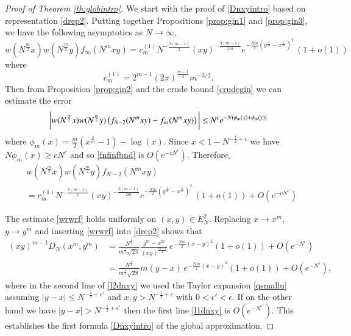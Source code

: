 \documentclass[11pt,reqno]{amsproc}
\numberwithin{equation}{section}
\numberwithin{theorem}{section}
\begin{document}
\begin{proof}[Proof of Theorem \ref{th:globintro}]	
We start with the proof of \eqref{Dnxyintro} based on representation \eqref{drep2}. Putting together Propositions \ref{prop:gin1} and \ref{prop:gin3}, we have the following asymptotics as $N \to \infty$,
\begin{equation}
w(N^{\frac{m}{2}}x)w(N^{\frac{m}{2}}y)f_{\infty}(N^{m}xy) = c_{m}^{(1)}N^{-\frac{3(m-1)}{2}}(xy)^{-\frac{3(m-1)}{2m}}e^{-\frac{Nm}{2}(y^{\frac{1}{m}}-x^{\frac{1}{m}})^{2}}\,(1+o(1)) 
\end{equation}
where
\begin{equation}
c_{m}^{(1)} = 2^{m-1}(2\pi)^{\frac{m-1}{2}}m^{-3/2}.
\end{equation}
Then from Proposition \ref{prop:gin2} and the crude bound \eqref{crudegin} we can estimate the error
\begin{equation}
\bigg{|}w(N^{\frac{m}{2}}x)w(N^{\frac{m}{2}}y)\left(f_{N-2}(N^{m}xy)-f_{\infty}(N^{m}xy)\right)\bigg{|} \leq N^{c}e^{-N(\phi_{m}(x)+\phi_{m}(y))} \label{fnfinfbnd}
\end{equation}
where $\phi_{m}(x) = \frac{m}{2}(x^{\frac{2}{m}}-1)-\log(x)$. Since $x < 1-N^{-\frac{1}{2}+\epsilon}$ we have $N\phi_{m}(x) \geq cN^{\epsilon}$ and so \eqref{fnfinfbnd} is $O(e^{-cN^{\epsilon}})$. Therefore,
\begin{equation}
\begin{split}
&w(N^{\frac{m}{2}}x)w(N^{\frac{m}{2}}y)f_{N-2}(N^{m}xy)\\
&= c_{m}^{(1)}N^{-\frac{3(m-1)}{2}}(xy)^{-\frac{3(m-1)}{2m}}e^{-\frac{Nm}{2}(y^{\frac{1}{m}}-x^{\frac{1}{m}})^{2}}\,(1+o(1)) + O(e^{-cN^{\epsilon}}) \label{wrwrf}
\end{split}
\end{equation}

The estimate \eqref{wrwrf} holds uniformly on $(x,y) \in E_{N}^{2}$. Replacing $x \to x^{m}$, $y \to y^{m}$ and inserting \eqref{wrwrf} into \eqref{drep2} shows that
\begin{align}
(xy)^{m-1}D_{N}(x^{m},y^{m}) &= \frac{N^{\frac{3}{2}}}{m^{\frac{3}{2}}\sqrt{2\pi}}\frac{y^{m}-x^{m}}{(xy)^{\frac{m-1}{2}}}\,e^{-\frac{Nm}{2}(x-y)^{2}}(1+o(1)) + O(e^{-N^{\epsilon}}) \label{l1dnxy}\\
&= \frac{N^{\frac{3}{2}}}{m^{\frac{3}{2}}\sqrt{2\pi}}m(y-x)\,e^{-\frac{Nm}{2}(x-y)^{2}}(1+o(1)) + O(e^{-N^{\epsilon}}), \label{l2dnxy}
\end{align}
where in the second line of \eqref{l2dnxy} we used the Taylor expansion \eqref{qsmallu} assuming $|y-x| \leq N^{-\frac{1}{2}+\epsilon'}$ and $x, y > N^{-\frac{1}{2}+\epsilon}$ with $0 < \epsilon' < \epsilon$. If on the other hand we have $|y-x| > N^{-\frac{1}{2}+\epsilon'}$ then the first line \eqref{l1dnxy} is $O(e^{-N^{\epsilon'}})$. This establishes the first formula \eqref{Dnxyintro} of the global approximation. 


\end{proof}
\end{document}
